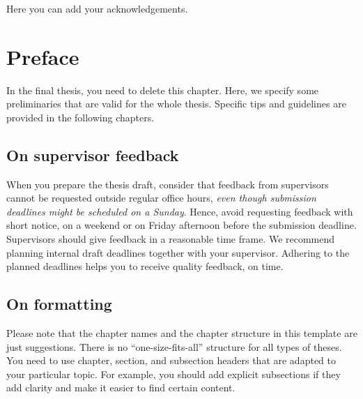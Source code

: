 \documentclass[a4paper,twoside]{bth}
\begin{document}
\cleardoublepage


\acknowledgments %
\noindent
Here you can add your acknowledgements.

\cleardoublepage


\setcounter{secnumdepth}{3} %
\tableofcontents

\cleardoublepage
\pagestyle{headings}


\chapter{Preface}
In the final thesis, you need to delete this chapter. Here, we specify some preliminaries that are valid for the whole thesis. Specific tips and guidelines are provided in the following chapters.



\section{On supervisor feedback}
When you prepare the thesis draft, consider that feedback from supervisors cannot be requested outside regular office hours, \emph{even though submission deadlines might be scheduled on a Sunday}. Hence, avoid requesting feedback with short notice, on a weekend or on Friday afternoon before the submission deadline. Supervisors should give feedback in a reasonable time frame. We recommend planning internal draft deadlines together with your supervisor. Adhering to the planned deadlines helps you to receive quality feedback, on time. 


\section{On formatting}
Please note that the chapter names and the chapter structure in this template are
just suggestions. There is no ``one-size-fits-all'' structure for all types of theses.
You need to use chapter, section, and subsection headers that are adapted to your
particular topic. For example, you should add explicit subsections if they add clarity and make it easier to find certain content. 
\end{document}

